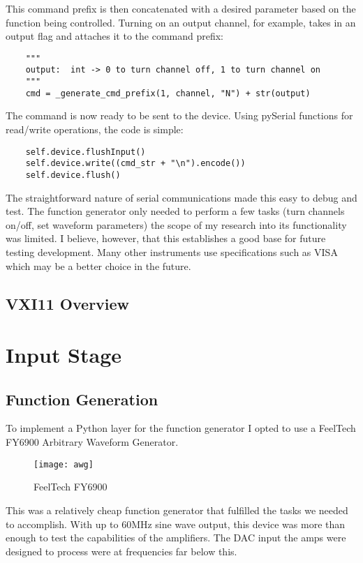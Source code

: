 This command prefix is then concatenated with a desired parameter based on the function being controlled. Turning on an output channel, for example, takes in an output flag and attaches it to the command prefix:
\begin{lstlisting}
	"""
	output:  int -> 0 to turn channel off, 1 to turn channel on
	"""
	cmd = _generate_cmd_prefix(1, channel, "N") + str(output)
\end{lstlisting}
The command is now ready to be sent to the device. Using pySerial functions for read/write operations, the code is simple:
\begin{lstlisting}
	self.device.flushInput()
	self.device.write((cmd_str + "\n").encode())
	self.device.flush()
\end{lstlisting}
The straightforward nature of serial communications made this easy to debug and test. The function generator only needed to perform a few tasks (turn channels on/off, set waveform parameters) the scope of my research into its functionality was limited. I believe, however, that this establishes a good base for future testing development. Many other instruments use specifications such as VISA which may be a better choice in the future.

\subsection{VXI11 Overview}


\section{Input Stage}
\subsection{Function Generation}
To implement a Python layer for the function generator I opted to use a FeelTech FY6900 Arbitrary Waveform Generator.
\begin{figure}[!htb]
	\centering
	\texttt{[image: awg]}
	\caption{FeelTech FY6900}
\end{figure}
This was a relatively cheap function generator that fulfilled the tasks we needed to accomplish. With up to 60MHz sine wave output, this device was more than enough to test the capabilities of the amplifiers. The DAC input the amps were designed to process were at frequencies far below this.
